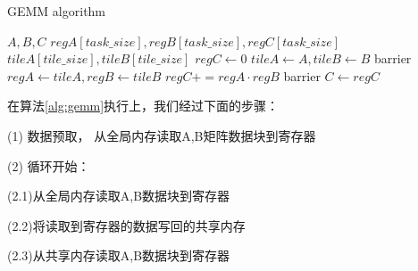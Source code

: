 
\begin{algorithm}[htbp]
	\small
	\caption{GEMM algorithm}\label{alg:gemm}
	\begin{algorithmic}[1]
		\State $A, B, C$
		\State $regA[task\_size],regB[task\_size],regC[task\_size]$
		\State $tileA[tile\_size],tileB[tile\_size]$
		\State $regC \gets 0$
        \State $tileA \gets A, tileB \gets B $
        \State barrier
        \State $regA \gets tileA, regB \gets tileB$
        \State $regC += regA \cdot regB$
        \EndFor
        \State barrier
		\EndWhile\label{gemmendwhile}
		\State $C \gets regC$
	\end{algorithmic}
\end{algorithm}

在算法\ref{alg:gemm}执行上，我们经过下面的步骤：

(1)	数据预取， 从全局内存读取A,B矩阵数据块到寄存器

(2) 循环开始：

   (2.1)从全局内存读取A,B数据块到寄存器

   (2.2)将读取到寄存器的数据写回的共享内存

   (2.3)从共享内存读取A,B数据块到寄存器

